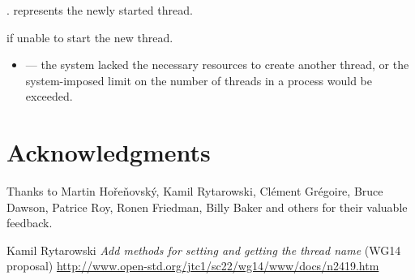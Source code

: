\documentclass{wg21}
\begin{document}
\begin{itemdescr}
\pnum
\ensures
{}.  represents the newly started thread.

\pnum
\throws
{} if unable to start the new thread.

\pnum
\errors
\begin{itemize}
    \item {} --- the system lacked the necessary
    resources to create another thread, or the system-imposed limit on the number of
    threads in a process would be exceeded.
\end{itemize}
\end{itemdescr}



\section{Acknowledgments}

Thanks to Martin Hořeňovský, Kamil Rytarowski, Clément Grégoire, Bruce Dawson, Patrice Roy, Ronen Friedman, Billy Baker and others for their valuable feedback.






\renewcommand{\section}[2]{}%
\begin{thebibliography}{9}
    \nocite{N4830}
    
    Kamil Rytarowski
    \emph{Add methods for setting and getting the thread name} (WG14 proposal)\newline
    \url{http://www.open-std.org/jtc1/sc22/wg14/www/docs/n2419.htm}
\end{thebibliography}
\end{document}
